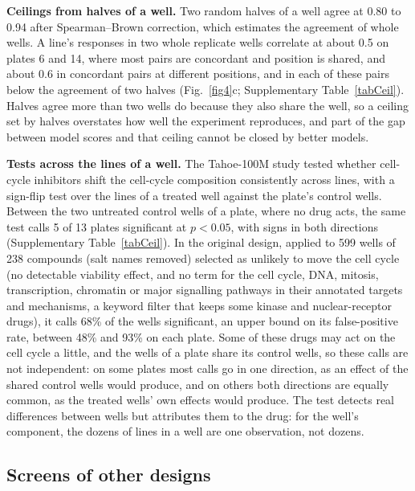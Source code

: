 \documentclass[pdflatex,sn-nature]{sn-jnl}
\begin{document}
\textbf{Ceilings from halves of a well.} Two random halves of a well agree at 0.80 to 0.94 after Spearman--Brown correction\cite{spearman1910,brown1910}, which estimates the agreement of whole wells. A line's responses in two whole replicate wells correlate at about 0.5 on plates 6 and 14, where most pairs are concordant and position is shared, and about 0.6 in concordant pairs at different positions, and in each of these pairs below the agreement of two halves (Fig.~\ref{fig4}c; Supplementary Table~\ref{tabCeil}). Halves agree more than two wells do because they also share the well, so a ceiling set by halves overstates how well the experiment reproduces, and part of the gap between model scores and that ceiling cannot be closed by better models.

\textbf{Tests across the lines of a well.} The Tahoe-100M study tested whether cell-cycle inhibitors shift the cell-cycle composition consistently across lines, with a sign-flip test over the lines of a treated well against the plate's control wells\cite{zhang2026}. Between the two untreated control wells of a plate, where no drug acts, the same test calls 5 of 13 plates significant at $p<0.05$, with signs in both directions (Supplementary Table~\ref{tabCeil}). In the original design, applied to 599 wells of 238 compounds (salt names removed) selected as unlikely to move the cell cycle (no detectable viability effect, and no term for the cell cycle, DNA, mitosis, transcription, chromatin or major signalling pathways in their annotated targets and mechanisms, a keyword filter that keeps some kinase and nuclear-receptor drugs), it calls 68\% of the wells significant, an upper bound on its false-positive rate, between 48\% and 93\% on each plate. Some of these drugs may act on the cell cycle a little, and the wells of a plate share its control wells, so these calls are not independent: on some plates most calls go in one direction, as an effect of the shared control wells would produce, and on others both directions are equally common, as the treated wells' own effects would produce. The test detects real differences between wells but attributes them to the drug: for the well's component, the dozens of lines in a well are one observation, not dozens.

\subsection{Screens of other designs}
\end{document}
